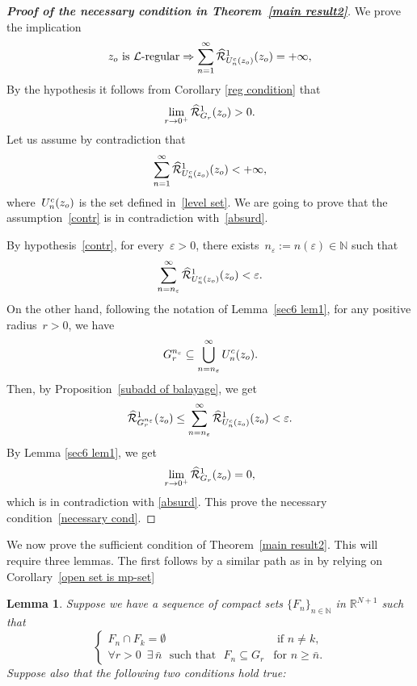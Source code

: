 \documentclass{amsart}
\newtheorem{lemma}[thm]{Lemma}
\numberwithin{equation}{section}
\def \eps{{\varepsilon}}
\def \Lc{{\mathcal{L}}}
\def \r{{\mathbb{R}}}
\def \balayage{{\widehat{\mathcal{R}}}}
\begin{document}
{\begin{proof}[\bf Proof of the necessary condition in Theorem~{\rm \ref{main result2}}] 
We prove the implication
\begin{equation}\label{necessary cond}
z_{\rm o} \mbox{ is $\Lc$-regular} \Rightarrow \sum_{n =1}^{\infty}\balayage^1_{U^c_n(z_{\rm o})}(z_{\rm o}) = +\infty,
\end{equation}
By the hypothesis it follows from Corollary \ref{reg condition} that
\begin{equation}\label{absurd}
\lim_{r \rightarrow 0^+}\balayage^1_{G_r}(z_{\rm o})>0.
\end{equation}
Let us assume by contradiction that 
\begin{equation}\label{contr}
 \sum_{n =1}^{\infty}\balayage^1_{U^c_n(z_{\rm o})}(z_{\rm o}) <+\infty,
\end{equation}
where~$U^c_n(z_{\rm o})$ is the set defined in~\eqref{level set}. 
We are going to prove that the assumption~\eqref{contr} is in contradiction with~\eqref{absurd}. 

By hypothesis~\eqref{contr}, for every~$\eps>0$, there exists~$n_\eps:= n(\eps)\in \mathbb{N}$ such that
$$
 \sum_{n=n_\eps}^{\infty}\balayage^1_{U^c_n(z_{\rm o})}(z_{\rm o}) <\eps.
$$
On the other hand, following the notation of Lemma~\ref{sec6 lem1}, for any positive radius~$r>0$, we have
$$
G_r^{n_\eps} \subseteq \bigcup_{n = n_\eps}^\infty U^c_n(z_{\rm o}).
$$
Then, by Proposition~\ref{subadd of balayage}, we get
$$
\balayage^1_{G_r^{n_\eps}}(z_{\rm o}) \leq  \sum  _{n =n_\eps}^{\infty}\balayage^1_{U^c_n(z_{\rm o})}(z_{\rm o}) < \eps.
$$
By Lemma \ref{sec6 lem1}, we get
$$
\lim_{r \rightarrow 0^+}\balayage^1_{G_r}(z_{\rm o})=0,
$$
which is in contradiction with \eqref{absurd}. This prove the necessary condition~\eqref{necessary cond}.
\end{proof}



We now prove the sufficient condition of Theorem~\ref{main result2}. This will require three lemmas. The first follows by a similar path as in \cite[Lemma 6.1]{KLT18} by relying on Corollary~\ref{open set is mp-set}

\begin{lemma}
Suppose we have a sequence of compact sets $\{F_n\}_{n\in \mathbb{N}}$ in $\r^{N+1}$ such that
$$
\begin{cases}
F_n\cap F_k=\emptyset & \text{ if }n\neq k,\\
\forall r>0\,\,\, \exists \,\bar{n} \,\,\mbox{ such that }\,\, F_n\subseteq G_r &  \text{for }n\geq\bar{n}.
\end{cases}
$$
Suppose also that the following two conditions hold true:
\begin{itemize}


\end{itemize}
\end{lemma}}
\end{document}
